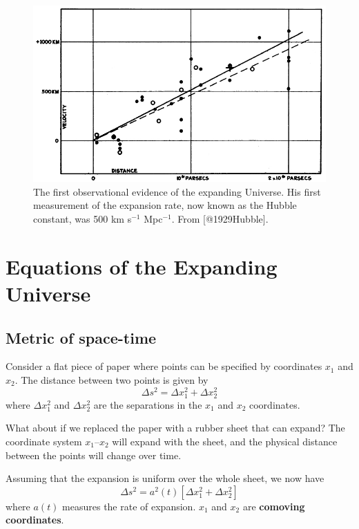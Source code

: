 \documentclass[11pt,a4paper,notoc]{tufte-handout}
\begin{document}
\begin{figure}
\includegraphics[width=1\linewidth]{Images/hubble-diagram} \caption{The first observational evidence of the expanding Universe. His first measurement of the expansion rate, now known as the Hubble constant, was 500 km s$^{-1}$ Mpc$^{-1}$. From [@1929Hubble].}\label{fig:hubble-h0-diagram}
\end{figure}

\hypertarget{ch:eqs_of_expanding}{%
\section{Equations of the Expanding Universe}\label{ch:eqs_of_expanding}}

\hypertarget{sec:metric}{%
\subsection{Metric of space-time}\label{sec:metric}}

Consider a flat piece of paper where points can be specified by
coordinates \(x_1\) and \(x_2\). The distance between two points is given by
\begin{equation}
\Delta s^2 = \Delta x_{1}^{2} + \Delta x_{2}^{2}
\label{eq:dist01}
\end{equation}
where
\(\Delta x_{1}^{2}\) and \(\Delta x_{2}^{2}\) are the separations in the
\(x_1\) and \(x_2\) coordinates.

What about if we replaced the paper with a rubber sheet that can expand?
The coordinate system \(x_1\)--\(x_2\) will expand with the sheet, and the
physical distance between the points will change over time.

Assuming that the expansion is uniform over the whole sheet, we now have
\begin{equation}
\Delta s^2 = a^2(t)\left[\Delta x_{1}^{2} + \Delta x_{2}^{2}\right]
\label{eq:comoving01}
\end{equation}
where \(a(t)\) measures the rate of expansion. \(x_1\) and \(x_2\) are
\textbf{comoving coordinates}.
\end{document}
